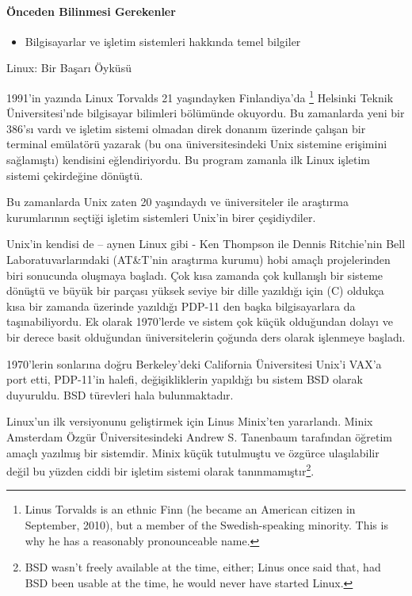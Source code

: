 \paragraph{Önceden Bilinmesi Gerekenler}
\begin{itemize}
 \item Bilgisayarlar ve işletim sistemleri hakkında temel bilgiler
 \end{itemize}
\begin{section}{Linux: Bir Başarı Öyküsü}

1991'in yazında Linux Torvalds 21 yaşındayken Finlandiya’da
\footnote{Linus Torvalds is an ethnic Finn (he became an American citizen in September, 2010), but a member of the Swedish-speaking minority. This is why he has a reasonably pronounceable name.} Helsinki Teknik Üniversitesi'nde bilgisayar bilimleri bölümünde okuyordu. Bu zamanlarda yeni bir 386'sı vardı ve işletim sistemi olmadan direk donanım üzerinde çalışan bir terminal emülatörü yazarak (bu ona üniversitesindeki Unix sistemine erişimini sağlamıştı) kendisini eğlendiriyordu.  Bu program zamanla ilk Linux işletim sistemi çekirdeğine dönüştü.

Bu zamanlarda Unix zaten 20 yaşındaydı ve üniversiteler ile araştırma kurumlarının seçtiği işletim sistemleri Unix'in birer çeşidiydiler.

Unix'in kendisi de – aynen Linux gibi - Ken Thompson ile Dennis Ritchie'nin Bell Laboratuvarlarındaki (AT\&T'nin araştırma kurumu) hobi amaçlı projelerinden biri sonucunda oluşmaya başladı. Çok kısa zamanda çok kullanışlı bir sisteme dönüştü ve büyük bir parçası yüksek seviye bir dille yazıldığı için (C) oldukça kısa bir zamanda üzerinde yazıldığı PDP-11 den başka bilgisayarlara da taşınabiliyordu. Ek olarak 1970'lerde ve sistem çok küçük olduğundan dolayı ve bir derece basit olduğundan üniversitelerin çoğunda ders olarak işlenmeye başladı.

1970'lerin sonlarına doğru Berkeley'deki California Üniversitesi Unix'i VAX'a port etti, PDP-11'in halefi, değişikliklerin yapıldığı bu sistem BSD olarak duyuruldu. BSD türevleri hala bulunmaktadır.

Linux’un ilk versiyonunu geliştirmek için Linus Minix’ten yararlandı. Minix Amsterdam Özgür Üniversitesindeki Andrew S. Tanenbaum tarafından öğretim amaçlı yazılmış bir sistemdir. Minix küçük tutulmuştu ve özgürce ulaşılabilir değil bu yüzden ciddi bir işletim sistemi olarak tanınmamıştır\footnote{BSD wasn’t freely available at the time, either; Linus once said that, had BSD been usable at the time, he would never have started Linux.}.


\end{section}
